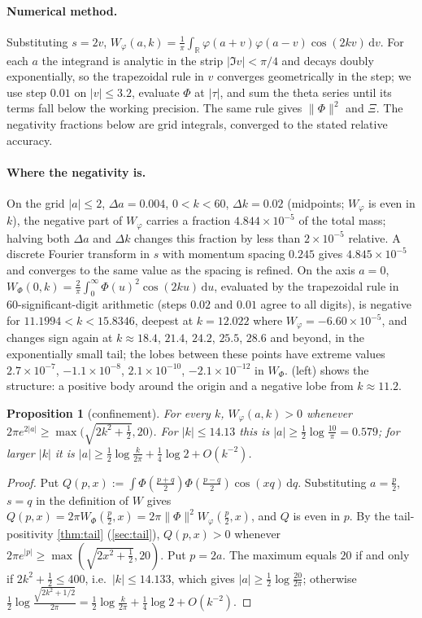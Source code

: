 \documentclass[11pt]{article}
\newtheorem{proposition}[theorem]{Proposition}
\theoremstyle{definition}\newtheorem{definition}[theorem]{Definition}
\theoremstyle{remark}\newtheorem{remark}[theorem]{Remark}
\newcommand{\R}{\mathbb R}\newcommand{\C}{\mathbb C}\newcommand{\N}{\mathbb N}
\newcommand{\dd}{\,\mathrm d}\newcommand{\e}{\mathrm e}
\begin{document}
\paragraph{Numerical method.} Substituting $s=2v$, $W_\varphi(a,k)=\frac1\pi\int_\R\varphi(a+v)\varphi(a-v)\cos(2kv)\dd v$. For each $a$ the integrand is analytic in the strip $|\Im v|<\pi/4$ and decays doubly exponentially, so the trapezoidal rule in $v$ converges geometrically in the step; we use step $0.01$ on $|v|\le3.2$, evaluate $\Phi$ at $|\tau|$, and sum the theta series until its terms fall below the working precision. The same rule gives $\|\Phi\|^2$ and $\Xi$. The negativity fractions below are grid integrals, converged to the stated relative accuracy.

\paragraph{Where the negativity is.} On the grid $|a|\le2$, $\Delta a=0.004$, $0<k<60$, $\Delta k=0.02$ (midpoints; $W_\varphi$ is even in $k$), the negative part of $W_\varphi$ carries a fraction $4.844\times10^{-5}$ of the total mass; halving both $\Delta a$ and $\Delta k$ changes this fraction by less than $2\times10^{-5}$ relative. A discrete Fourier transform in $s$ with momentum spacing $0.245$ gives $4.845\times10^{-5}$ and converges to the same value as the spacing is refined. On the axis $a=0$, $W_\Phi(0,k)=\frac2\pi\int_0^\infty\Phi(u)^2\cos(2ku)\dd u$, evaluated by the trapezoidal rule in 60-significant-digit arithmetic (steps $0.02$ and $0.01$ agree to all digits), is negative for $11.1994<k<15.8346$, deepest at $k=12.022$ where $W_\varphi=-6.60\times10^{-5}$, and changes sign again at $k\approx18.4$, $21.4$, $24.2$, $25.5$, $28.6$ and beyond, in the exponentially small tail; the lobes between these points have extreme values $2.7\times10^{-7}$, $-1.1\times10^{-8}$, $2.1\times10^{-10}$, $-2.1\times10^{-12}$ in $W_\Phi$.  (left) shows the structure: a positive body around the origin and a negative lobe from $k\approx11.2$.

\begin{proposition}[confinement]\label{prop:confine}
For every $k$, $W_\varphi(a,k)>0$ whenever $2\pi e^{2|a|}\ge\max\bigl(\sqrt{2k^2+\frac12},20\bigr)$. For $|k|\le14.13$ this is $|a|\ge\frac12\log\frac{10}\pi=0.579$; for larger $|k|$ it is $|a|\ge\frac12\log\frac k{2\pi}+\frac14\log2+O(k^{-2})$.
\end{proposition}
\begin{proof}
Put $Q(p,x):=\int\Phi(\frac{p+q}2)\Phi(\frac{p-q}2)\cos(xq)\dd q$. Substituting $a=\frac p2$, $s=q$ in the definition of $W$ gives $Q(p,x)=2\pi W_\Phi(\frac p2,x)=2\pi\|\Phi\|^2W_\varphi(\frac p2,x)$, and $Q$ is even in $p$. By the tail-positivity \cref{thm:tail} (\cref{sec:tail}), $Q(p,x)>0$ whenever $2\pi e^{|p|}\ge\max(\sqrt{2x^2+\frac12},20)$. Put $p=2a$. The maximum equals $20$ if and only if $2k^2+\frac12\le400$, i.e.\ $|k|\le14.133$, which gives $|a|\ge\frac12\log\frac{20}{2\pi}$; otherwise $\frac12\log\frac{\sqrt{2k^2+1/2}}{2\pi}=\frac12\log\frac k{2\pi}+\frac14\log2+O(k^{-2})$.
\end{proof}
\end{document}
